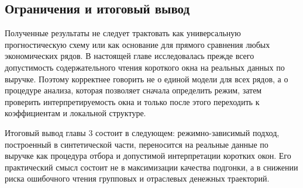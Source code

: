 \subsection{Ограничения и итоговый вывод}
\label{sec:ogranicheniya-i-itogovyi-vyvod}

Полученные результаты не следует трактовать как универсальную прогностическую схему или как основание для прямого сравнения любых экономических рядов. В настоящей главе исследовалась прежде всего допустимость содержательного чтения короткого окна на реальных данных по выручке. Поэтому корректнее говорить не о единой модели для всех рядов, а о процедуре анализа, которая позволяет сначала определить режим, затем проверить интерпретируемость окна и только после этого переходить к коэффициентам и локальной структуре.

Итоговый вывод главы 3 состоит в следующем: режимно-зависимый подход, построенный в синтетической части, переносится на реальные данные по выручке как процедура отбора и допустимой интерпретации коротких окон. Его практический смысл состоит не в максимизации качества подгонки, а в снижении риска ошибочного чтения групповых и отраслевых денежных траекторий.
